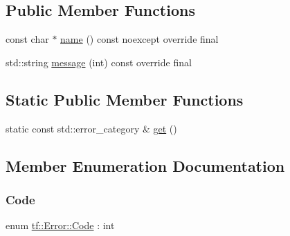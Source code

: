 \subsection*{Public Member Functions}
\begin{DoxyCompactItemize}
\item 
const char $\ast$ \hyperlink{structtf_1_1Error_a18a5c2f16b543d5361e8a24554ebd12c}{name} () const noexcept override final
\item 
std\+::string \hyperlink{structtf_1_1Error_ae2d8630128262023502664f3cae5daab}{message} (int) const override final
\end{DoxyCompactItemize}
\subsection*{Static Public Member Functions}
\begin{DoxyCompactItemize}
\item 
static const std\+::error\+\_\+category \& \hyperlink{structtf_1_1Error_a2fdb64a058ea1ff03706d0cd69c36021}{get} ()
\end{DoxyCompactItemize}


\subsection{Member Enumeration Documentation}
\mbox{\label{structtf_1_1Error_aad6732b815bfe4ae3cea402042ee43a3}} 
\subsubsection{\texorpdfstring{Code}{Code}}
{\footnotesize\ttfamily enum \hyperlink{structtf_1_1Error_aad6732b815bfe4ae3cea402042ee43a3}{tf\+::\+Error\+::\+Code} \+: int}

